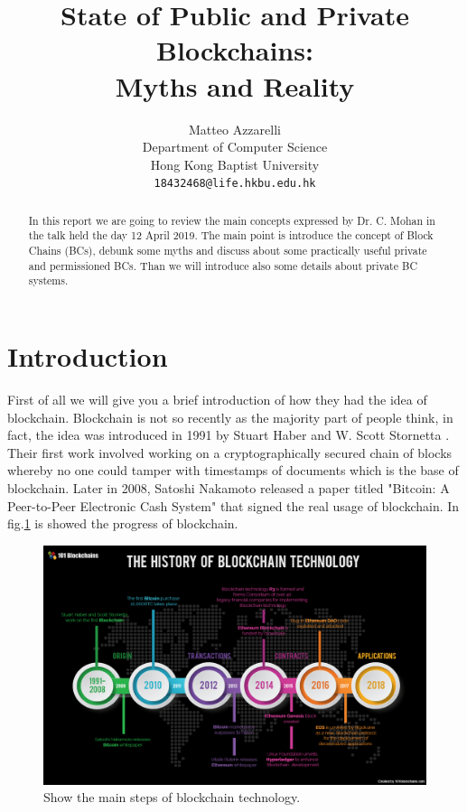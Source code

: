 \documentclass{article}
\title{State of Public and Private Blockchains:\\Myths and Reality}
\author{
  Matteo Azzarelli\\
  Department of Computer Science\\
  Hong Kong Baptist University\\
  \texttt{18432468@life.hkbu.edu.hk} \\
}
\begin{document}
\maketitle

\begin{abstract}
    In this report we are going to review the main concepts expressed by Dr. C. Mohan in the talk held the day 12 April 2019.
    The main point is introduce the concept of Block Chains (BCs), debunk some myths and discuss about some practically useful private and permissioned BCs.
    Than we will introduce also some details about private BC systems.
\end{abstract}




\section{Introduction}
    First of all we will give you a brief introduction of how they had the idea of blockchain. \cite{wiki-Blockchain} Blockchain is not so recently as the majority part of people think, in fact, the idea was introduced in 1991 by Stuart Haber and W. Scott Stornetta \cite{haber1990time,HistoryBCT}. Their first work involved working on a cryptographically secured chain of blocks whereby no one could tamper with timestamps of documents which is the base of blockchain. Later in 2008, Satoshi Nakamoto released a paper titled "Bitcoin: A Peer-to-Peer Electronic Cash System" \cite{nakamoto2008bitcoin} that signed the real usage of blockchain.
    In fig.\ref{fig:historyOfBlockchain} is showed the progress of blockchain.
    
    \begin{figure}[h]
        \centering
        \includegraphics[width=0.8\linewidth]{History_of_Blockchain_Technology.png}
        \caption{Show the main steps of blockchain technology. \cite{HistoryBCT}}
        \label{fig:historyOfBlockchain}
    \end{figure}
    
\end{document}
